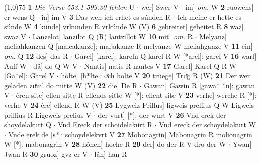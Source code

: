\documentclass[8pt,a4paper,notitlepage]{article}
\begin{document}
\begin{table}[ht]
\begin{minipage}[t]{0.5\linewidth}
\line(1,0){75} \newline
\textbf{1} \textit{Die Verse 553.1-599.30 fehlen} U   $\cdot$ wer] Swer V  $\cdot$ im] \textit{om.} W \textbf{2} ruowens] er wens Q  $\cdot$ in] im V \textbf{3} Das wen ich erhet es súnden R  $\cdot$ Ich meine er hette es súnde W \textbf{4} künde] vrkunden R vrkúnde W (V) \textbf{6} gebreitet] gebeitet R \textbf{8} waz] swaz V  $\cdot$ Lanzelot] lanzilot Q (R) lantzillot W \textbf{10} mit] \textit{om.} R  $\cdot$ Melyanz] meliahkanzen Q [maleakanze]: maljakanze R melyanze W meliahganze V \textbf{11} ein] \textit{om.} Q \textbf{12} des] das R  $\cdot$ Garel] [karel]: kareln Q karel R W [*arel]: garel V \textbf{16} warf] Auff W  $\cdot$ dâ] do Q W V  $\cdot$ Nantis] natis R nantes V \textbf{17} Garel] Karel Q R W [Ga*el]: Garel V  $\cdot$ holte] [h*lte]: oͮch holte V \textbf{20} trüege] Truͯg R (W) \textbf{21} Der wer geladen zuͦuil do mitte W (V) \textbf{22} die] De R  $\cdot$ Gawan] Gawin R [gawa* *n]: gawan V  $\cdot$ êren site] ellen sitte R ellends sitte W [*]: ellent site V \textbf{23} verhe] werche R [*]: verhe V \textbf{24} êre] ellend R W (V) \textbf{25} Lygweiz Prillus] ligweis prellius Q W Ligweis prillius R Ligeweis prelius V  $\cdot$ der vurt] [*]: der wurt V \textbf{26} Vnd erek der shoydelakurt Q  $\cdot$ Vnd Ereck der schoidelakuͦrt R  $\cdot$ Vnd ereck der schoydelakurt W  $\cdot$ Vnde erek de [s*]: schoẏdelekvrt V \textbf{27} Mobonagrin] Mabonagrin R molionagrin W [*]: mabonagrin V \textbf{28} hôhen] hoche R \textbf{29} der] do der R V dro der W  $\cdot$ Ywan] Jwan R \textbf{30} gruoz] gvz er V  $\cdot$ lân] han R \newline
\end{minipage}
\end{table}
\end{document}
